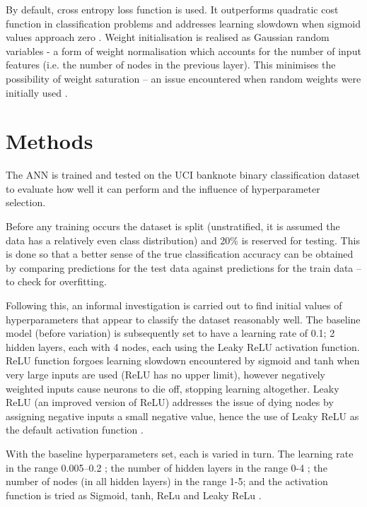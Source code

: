 \documentclass[12pt]{article}
\begin{document}
By default, cross entropy loss function is used. It outperforms
quadratic cost function in classification problems and addresses
learning slowdown when sigmoid values approach zero \cite{Nielsen}
\cite{Xavier}. Weight initialisation is realised as Gaussian random
variables - a form of weight normalisation which accounts for the number
of input features (i.e. the number of nodes in the previous layer). This
minimises the possibility of weight saturation -- an issue
encountered when random weights were initially used \cite{Nielsen}.

\vspace{-1.5em}
\section{Methods}
\vspace{-1.5em}

The ANN is trained and tested on the UCI banknote binary
classification dataset to evaluate how well it can perform and the
influence of hyperparameter selection.

Before any training occurs the dataset is split (unstratified, it is
assumed the data has a relatively even class distribution) and 20\%
is reserved for testing. This is done so that a better sense of the
true classification accuracy can be obtained by comparing predictions
for the test data against predictions for the train data -- to check for
overfitting.

Following this, an informal investigation is carried out to find initial
values of hyperparameters that appear to classify the dataset reasonably
well. The baseline model (before variation) is subsequently set to
have a learning rate of 0.1; 2 hidden layers, each with 4 nodes,
each using the Leaky ReLU activation function. ReLU function forgoes learning slowdown encountered by sigmoid and tanh when very large inputs are used (ReLU has no upper limit), however negatively weighted inputs cause neurons to die off, stopping learning altogether. Leaky ReLU (an improved version of ReLU) addresses the issue of dying nodes by assigning negative inputs a small negative value, hence the use of Leaky ReLU as the default activation function \cite{Niwa}.

With the baseline hyperparameters set, each is varied in turn. The
learning rate in the range 0.005--0.2 \cite{Nielsen}; the number of hidden layers in
the range 0-4 \cite{Xavier}; the number of nodes (in all hidden layers) in the range
1-5; and the activation function is tried as Sigmoid, tanh, ReLu and
Leaky ReLu \cite{Niwa}.
\end{document}
